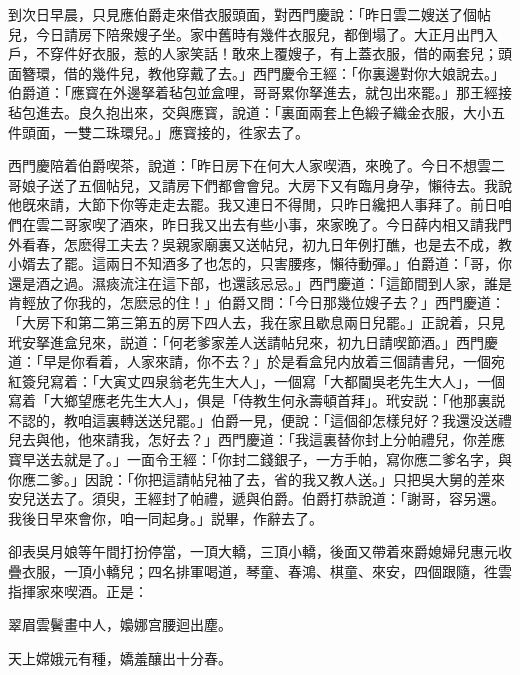 到次日早晨，只見應伯爵走來借衣服頭面，對西門慶說：「昨日雲二嫂送了個帖兒，今日請房下陪衆嫂子坐。家中舊時有幾件衣服兒，都倒塌了。大正月出門入戶，不穿件好衣服，惹的人家笑話！敢來上覆嫂子，有上蓋衣服，借的兩套兒；頭面簪環，借的幾件兒，教他穿戴了去。」西門慶令王經：「你裏邊對你大娘說去。」伯爵道：「應寳在外邊拏着毡包並盒哩，哥哥累你拏進去，就包出來罷。」那王經接毡包進去。良久抱出來，交與應寳，說道：「裏面兩套上色緞子織金衣服，大小五件頭面，一雙二珠環兒。」應寳接的，徃家去了。

西門慶陪着伯爵喫茶，說道：「昨日房下在何大人家喫酒，來晚了。今日不想雲二哥娘子送了五個帖兒，又請房下們都會會兒。大房下又有臨月身孕，懶待去。我說他旣來請，大節下你等走走去罷。我又連日不得閒，只昨日纔把人事拜了。前日咱們在雲二哥家喫了酒來，昨日我又出去有些小事，來家晚了。今日薛内相又請我門外看春，怎麽得工夫去？吳親家廟裏又送帖兒，初九日年例打醮，也是去不成，教小婿去了罷。這兩日不知酒多了也怎的，只害腰疼，懶待動彈。」伯爵道：「哥，你還是酒之過。濕痰流注在這下部，也還該忌忌。」西門慶道：「這節間到人家，誰是肯輕放了你我的，怎麽忌的住！」伯爵又問：「今日那幾位嫂子去？」西門慶道：「大房下和第二第三第五的房下四人去，我在家且歇息兩日兒罷。」正說着，只見玳安拏進盒兒來，説道：「何老爹家差人送請帖兒來，初九日請喫節酒。」西門慶道：「早是你看着，人家來請，你不去？」於是看盒兒内放着三個請書兒，一個宛紅簽兒寫着：「大寅丈四泉翁老先生大人」，一個寫「大都閫吳老先生大人」，一個寫着「大鄉望應老先生大人」，俱是「侍教生何永壽頓首拜」。玳安説：「他那裏説不認的，教咱這裏轉送送兒罷。」伯爵一見，便說：「這個卻怎樣兒好？我還没送禮兒去與他，他來請我，怎好去？」西門慶道：「我這裏替你封上分帕禮兒，你差應寳早送去就是了。」一面令王經：「你封二錢銀子，一方手帕，寫你應二爹名字，與你應二爹。」因說：「你把這請帖兒袖了去，省的我又教人送。」只把吳大舅的差來安兒送去了。須臾，王經封了帕禮，遞與伯爵。伯爵打恭說道：「謝哥，容另還。我後日早來會你，咱一同起身。」説畢，作辭去了。

卻表吳月娘等午間打扮停當，一頂大轎，三頂小轎，後面又帶着來爵媳婦兒惠元收疊衣服，一頂小轎兒；四名排軍喝道，琴童、春鴻、棋童、來安，四個跟隨，徃雲指揮家來喫酒。正是：　

\begin{myquote}
翠眉雲鬢畫中人，嬝娜宫腰迴出塵。

天上嫦娥元有種，嬌羞釀出十分春。
\end{myquote}

